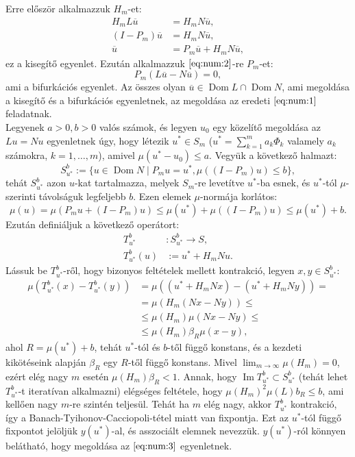 \documentclass[oneside, titlepage, 12pt, a4paper]{report}
\DeclareMathOperator{\Ima}{Im}	%
\DeclareMathOperator{\Dom}{Dom}	%
\begin{document}
Erre először alkalmazzuk $H_m$-et:
\begin{align}
H_m L \overline{u} &= H_m N \overline{u}, \nonumber \\
(I - P_m) \overline{u} &= H_m N \overline{u}, \nonumber \\
\overline{u} &= P_m \overline{u} + H_m N \overline{u}, \label{eq:num:3}
\end{align}
ez a kisegítő egyenlet. Ezután alkalmazzuk $\eqref{eq:num:2}$-re $P_m$-et: %
\begin{equation}
P_m(L \overline{u} - N \overline{u}) = 0, \label{eq:num:4}
\end{equation}
ami a bifurkációs egyenlet. Az összes olyan $\overline{u} \in \Dom L \cap \Dom N$, ami megoldása a kisegítő és a bifurkációs egyenletnek, az megoldása az eredeti $\eqref{eq:num:1}$ feladatnak. \\ %
Legyenek $a > 0, b > 0$ valós számok, és legyen $u_0$ egy közelítő megoldása az $Lu = Nu$ egyenletnek úgy, hogy létezik $u^* \in S_m$ ($u^* = \sum_{k=1}^m a_k \Phi_k$ valamely $a_k$ számokra, $k = 1, \dots, m$), amivel $\mu(u^* - u_0) \leq a$. Vegyük a következő halmazt:
\begin{equation*}
S_{u^*}^b := \{ u \in \Dom N \; | \; P_m u = u^*, \mu((I - P_m)u) \leq b \},
\end{equation*}
tehát $S_{u^*}^b$ azon $u$-kat tartalmazza, melyek $S_m$-re levetítve $u^*$-ba esnek, és $u^*$-tól $\mu$-szerinti távolságuk legfeljebb $b$. Ezen elemek $\mu$-normája korlátos:
\begin{equation*}
\mu(u) = \mu(P_m u + (I - P_m) u) \leq \mu(u^*) + \mu((I - P_m)u) \leq \mu(u^*) + b.
\end{equation*}
 Ezután definiáljuk a következő operátort:
\begin{align*}
T_{u^*}^b &: S_{u^*}^b \rightarrow S, \\
T_{u^*}^b (u) &:= u^* + H_m N u.
\end{align*}
Lássuk be $T_{u^*}^b$-ről, hogy bizonyos feltételek mellett kontrakció, legyen $x, y \in S_{u^*}^b$:
\begin{align*}
\mu( T_{u^*}^b(x) - T_{u^*}^b(y)) &= \mu((u^* + H_m N x) - (u^* + H_m N y)) = \\
&= \mu(H_m(N x - N y)) \leq \\
&\leq \mu(H_m) \mu(N x - N y) \leq \\
&\leq \mu(H_m) \beta_R \mu(x - y),
\end{align*}
ahol $R = \mu(u^*) + b$, tehát $u^*$-tól és $b$-től függő konstans, és a kezdeti kikötéseink alapján $\beta_R$ egy $R$-től függő konstans. Mivel $\lim_{m \to \infty} \mu(H_m) = 0$, ezért elég nagy $m$ esetén $\mu(H_m) \beta_R < 1$. Annak, hogy $\Ima  T_{u^*}^b \subset S_{u^*}^b$ (tehát lehet $ T_{u^*}^b$-t iteratívan alkalmazni) elégséges feltétele, hogy $\mu(H_m)^2 \mu(L) b_R \leq b$, ami kellően nagy $m$-re szintén teljesül. Tehát ha $m$ elég nagy, akkor $ T_{u^*}^b$ kontrakció, így a Banach-Tyihonov-Cacciopoli-tétel miatt van fixpontja. Ezt az $u^*$-tól függő fixpontot jelöljük $y(u^*)$-al, és asszociált elemnek nevezzük. $y(u^*)$-ról könnyen belátható, hogy megoldása az $\eqref{eq:num:3}$ egyenletnek. \\ %
\end{document}
